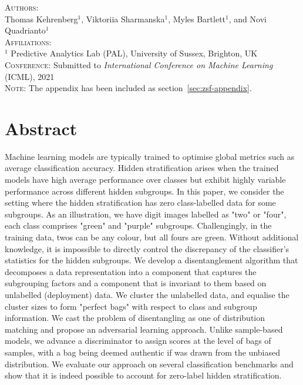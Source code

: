 
\textsc{Authors}:\\
Thomas Kehrenberg$^1$, Viktoriia Sharmanska$^1$, Myles Bartlett$^1$, and Novi Quadrianto$^1$ \\
\textsc{Affiliations}:\\
$^1$ Predictive Analytics Lab (PAL), University of Sussex, Brighton, UK\\
\textsc{Conference}:\;\; Submitted to \textit{International Conference on Machine Learning} (ICML), 2021 \\
\textsc{Note}:\;\; The appendix has been included as section~\ref{sec:zsf-appendix}.

\section{Abstract}
Machine learning models are typically trained to optimise global metrics such as average classification accuracy. 
%
Hidden stratification arises when the trained models have high average performance over classes but exhibit highly variable performance across different hidden subgroups.
%
In this paper, we consider the setting where the hidden stratification has zero class-labelled data for some subgroups. 
As an illustration, we have digit images labelled as "two" or "four", each class comprises "green" and "purple" subgroups.
%
Challengingly, in the training data, twos can be any colour, but all fours are green. 
%
Without additional knowledge, it is impossible to directly control the discrepancy of the classifier’s statistics for the hidden subgroups. 
%
We develop a disentanglement algorithm that decomposes a data representation into a component that captures the subgrouping factors and a component that is invariant to them based on unlabelled (deployment) data. 
%
We cluster the unlabelled data, and equalise the cluster sizes to form "perfect bags" with respect to class and subgroup information.
%
We cast the problem of disentangling as one of distribution matching and propose an adversarial learning approach.
%
%
Unlike sample-based models, we advance a discriminator to assign scores at the level of bags of samples, with a bag being deemed authentic if was drawn from the unbiased distribution. 
%
We evaluate our approach on several classification benchmarks and show that it is indeed possible to account for zero-label hidden stratification.

